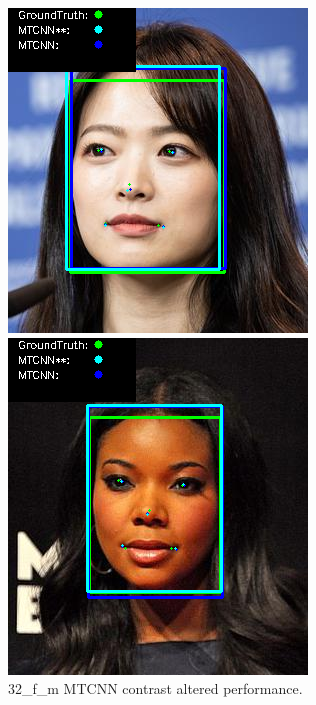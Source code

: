 \documentclass{l4proj}
\begin{document}
\begin{appendices}
\begin{figure}[h!]
  \centering
  \begin{minipage}{0.49\textwidth}
    \centering
     \includegraphics[width=\textwidth]{images/mtcnn/32.png}
    \caption{32\_f\_m MTCNN contrast altered performance.}
    \label{whoopi_result}
  \end{minipage}
    \hfill
    \begin{minipage}{0.49\textwidth}
    \centering
     \includegraphics[width=\textwidth]{images/mtcnn/33.png}

\end{minipage}
\end{figure}
\end{appendices}
\end{document}
